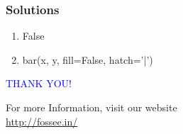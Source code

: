 \documentclass[presentation]{beamer}
\begin{document}
\begin{frame}
\frametitle{Solutions}
\label{sec-22}


\begin{enumerate}
\item False
\item bar(x, y, fill=False, hatch='|')
\end{enumerate}
\end{frame}
\begin{frame}

  \begin{block}{}
  \begin{center}
  \textcolor{blue}{\Large THANK YOU!} 
  \end{center}
  \end{block}
\begin{block}{}
  \begin{center}
    For more Information, visit our website\\
    \url{http://fossee.in/}
  \end{center}  
  \end{block}
\end{frame}
\end{document}
